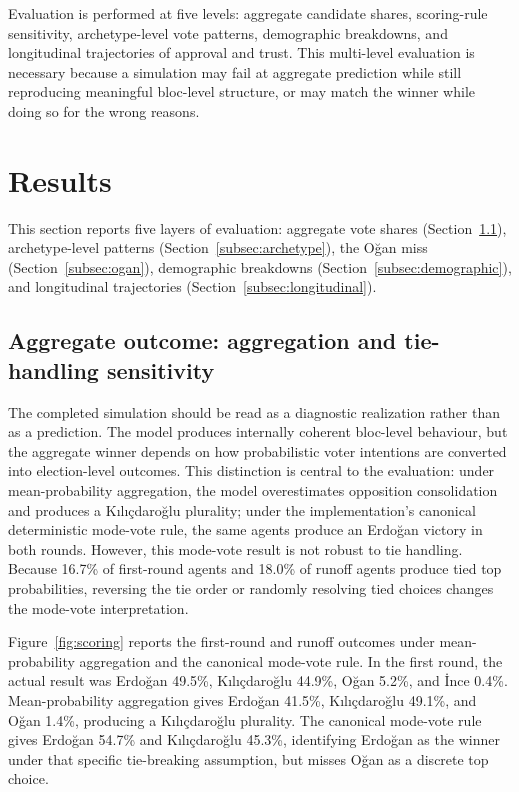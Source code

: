\documentclass[pdflatex,sn-mathphys-num,iicol]{sn-jnl}
\begin{document}
Evaluation is performed at five levels: aggregate candidate shares,
scoring-rule sensitivity, archetype-level vote patterns, demographic
breakdowns, and longitudinal trajectories of approval and trust. This
multi-level evaluation is necessary because a simulation may fail at aggregate
prediction while still reproducing meaningful bloc-level structure, or may match
the winner while doing so for the wrong reasons.


\section{Results}\label{sec:results}

This section reports five layers of evaluation: aggregate vote shares
(Section~\ref{subsec:aggregate}), archetype-level patterns
(Section~\ref{subsec:archetype}), the Oğan miss (Section~\ref{subsec:ogan}),
demographic breakdowns (Section~\ref{subsec:demographic}), and longitudinal
trajectories (Section~\ref{subsec:longitudinal}).

\subsection{Aggregate outcome: aggregation and tie-handling
sensitivity}\label{subsec:aggregate}

The completed simulation should be read as a diagnostic realization rather than
as a prediction. The model produces internally coherent bloc-level behaviour,
but the aggregate winner depends on how probabilistic voter intentions are
converted into election-level outcomes. This distinction is central to the
evaluation: under mean-probability aggregation, the model overestimates
opposition consolidation and produces a Kılıçdaroğlu plurality; under the
implementation's canonical deterministic mode-vote rule, the same agents produce
an Erdoğan victory in both rounds. However, this mode-vote result is not robust
to tie handling. Because 16.7\% of first-round agents and 18.0\% of runoff
agents produce tied top probabilities, reversing the tie order or randomly
resolving tied choices changes the mode-vote interpretation.

Figure~\ref{fig:scoring} reports the first-round and runoff outcomes under
mean-probability aggregation and the canonical mode-vote rule. In the first
round, the actual result was Erdoğan 49.5\%, Kılıçdaroğlu 44.9\%, Oğan 5.2\%,
and İnce 0.4\%. Mean-probability aggregation gives Erdoğan 41.5\%,
Kılıçdaroğlu 49.1\%, and Oğan 1.4\%, producing a Kılıçdaroğlu plurality. The
canonical mode-vote rule gives Erdoğan 54.7\% and Kılıçdaroğlu 45.3\%,
identifying Erdoğan as the winner under that specific tie-breaking assumption,
but misses Oğan as a discrete top choice.
\end{document}
